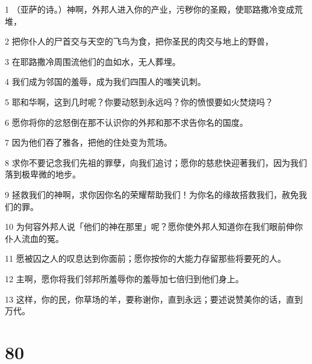 \par 1 （亚萨的诗。）神啊，外邦人进入你的产业，污秽你的圣殿，使耶路撒冷变成荒堆，
\par 2 把你仆人的尸首交与天空的飞鸟为食，把你圣民的肉交与地上的野兽，
\par 3 在耶路撒冷周围流他们的血如水，无人葬埋。
\par 4 我们成为邻国的羞辱，成为我们四围人的嗤笑讥刺。
\par 5 耶和华啊，这到几时呢？你要动怒到永远吗？你的愤恨要如火焚烧吗？
\par 6 愿你将你的忿怒倒在那不认识你的外邦和那不求告你名的国度。
\par 7 因为他们吞了雅各，把他的住处变为荒场。
\par 8 求你不要记念我们先祖的罪孽，向我们追讨；愿你的慈悲快迎著我们，因为我们落到极卑微的地步。
\par 9 拯救我们的神啊，求你因你名的荣耀帮助我们！为你名的缘故搭救我们，赦免我们的罪。
\par 10 为何容外邦人说「他们的神在那里」呢？愿你使外邦人知道你在我们眼前伸你仆人流血的冤。
\par 11 愿被囚之人的叹息达到你面前；愿你按你的大能力存留那些将要死的人。
\par 12 主啊，愿你将我们邻邦所羞辱你的羞辱加七倍归到他们身上。
\par 13 这样，你的民，你草场的羊，要称谢你，直到永远；要述说赞美你的话，直到万代。

\chapter{80}

